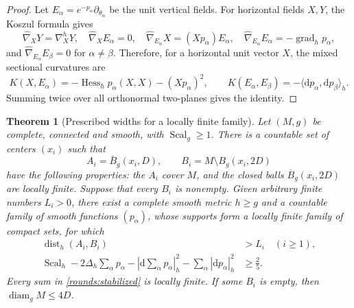 \documentclass[11pt]{article}
\numberwithin{equation}{section}
\newtheorem{theorem}{Theorem}[section]
\theoremstyle{definition}
\theoremstyle{remark}
\begin{document}
\begin{proof}
Let \(E_\alpha=e^{-p_\alpha}\partial_{\theta_\alpha}\) be the unit
vertical fields. For horizontal fields \(X,Y\), the Koszul formula gives
\[
 \widehat\nabla_XY=\nabla^h_XY,\quad
 \widehat\nabla_XE_\alpha=0,\quad
 \widehat\nabla_{E_\alpha}X=(Xp_\alpha)E_\alpha,\quad
 \widehat\nabla_{E_\alpha}E_\alpha=-\operatorname{grad}_h p_\alpha,
\]
and \(\widehat\nabla_{E_\alpha}E_\beta=0\) for \(\alpha\ne\beta\).
Therefore, for a horizontal unit vector \(X\), the mixed sectional
curvatures are
\[
 K(X,E_\alpha)=-\operatorname{Hess}_h p_\alpha(X,X)-(Xp_\alpha)^2,
 \qquad
 K(E_\alpha,E_\beta)=-\langle\mathrm d p_\alpha,\mathrm d p_\beta\rangle_h.
\]
Summing twice over all orthonormal two-planes gives the identity.
\end{proof}

\begin{theorem}[Prescribed widths for a locally finite family]\label{rounds:wide}
Let \((M,g)\) be complete, connected and smooth, with
\(\operatorname{Scal}_g\ge1\). There is a countable set of centers \((x_i)\) such that
\[
 A_i=\overline B_g(x_i,D),\qquad
 B_i=M\setminus B_g(x_i,2D)
\]
have the following properties: the \(A_i\) cover \(M\), and the closed
balls \(\overline B_g(x_i,2D)\) are locally finite. Suppose that every
\(B_i\) is nonempty. Given arbitrary finite numbers \(L_i>0\), there
exist a complete smooth metric \(h\ge g\) and a countable family of
smooth functions \((p_\alpha)\), whose supports form a locally finite
family of compact sets, for which
\begin{align}
 \operatorname{dist}_h(A_i,B_i)&>L_i \quad(i\ge1),\label{rounds:prescribed}\\
 \operatorname{Scal}_h-2\Delta_h\sum_\alpha p_\alpha
       -\left|\mathrm d\sum_\alpha p_\alpha\right|_h^2
       -\sum_\alpha|\mathrm d p_\alpha|_h^2&\ge\frac25.\label{rounds:stabilized}
\end{align}
Every sum in \eqref{rounds:stabilized} is locally finite. If some
\(B_i\) is empty, then \(\operatorname{diam}_g M\le4D\).
\end{theorem}
\end{document}
